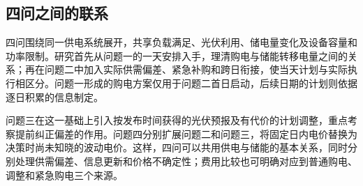 \subsection{四问之间的联系}
四问围绕同一供电系统展开，共享负载满足、光伏利用、储电量变化及设备容量和功率限制。研究首先从问题一的一天安排入手，理清购电与储能转移电量之间的关系；再在问题二中加入实际供需偏差、紧急补购和跨日衔接，使当天计划与实际执行相区分。问题一形成的购电方案仅用于问题二首日启动，后续日期的计划则依据逐日积累的信息制定。

问题三在这一基础上引入按发布时间获得的光伏预报及有代价的计划调整，重点考察提前纠正偏差的作用。问题四分别扩展问题二和问题三，将固定日内电价替换为决策时尚未知晓的波动电价。这样，四问可以共用供电与储能的基本关系，同时分别处理供需偏差、信息更新和价格不确定性；费用比较也可明确对应到普通购电、调整和紧急购电三个来源。
